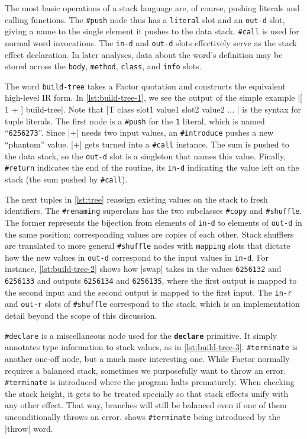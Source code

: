 The most basic operations of a stack language are, of course, pushing literals
and calling functions.  The \Verb|#push| node thus has a \Verb|literal| slot
and an \Verb|out-d| slot, giving a name to the single element it pushes to the
data stack.  \Verb|#call| is used for normal word invocations.  The \Verb|in-d|
and \Verb|out-d| slots effectively serve as the stack effect declaration.  In
later analyses, data about the word's definition may be stored across the
\Verb|body|, \Verb|method|, \Verb|class|, and \Verb|info| slots.

The word \Verb|build-tree| takes a Factor quotation and constructs the
equivalent high-level \gls{IR} form.  In \vref{lst:build-tree-1}, we see the
output of the simple example
%
\factor|[ 1 + ] build-tree|.
%
Note that
%
\factor|T{ class { slot1 value1 } { slot2 value2 } ... }|
%
is the syntax for tuple literals.  The first node is a \Verb|#push| for the
\Verb|1| literal, which is named ``\Verb|6256273|''.  Since \factor|+| needs
two input values, an \Verb|#introduce| pushes a new ``phantom'' value.
\factor|+| gets turned into a \Verb|#call| instance.  The sum is pushed to the
data stack, so the \Verb|out-d| slot is a singleton that names this value.
Finally, \Verb|#return| indicates the end of the routine, its \Verb|in-d|
indicating the value left on the stack (the sum pushed by \Verb|#call|).


The next tuples in \vref{lst:tree} reassign existing values on the stack to
fresh identifiers.  The \Verb|#renaming| superclass has the two subclasses
\Verb|#copy| and \Verb|#shuffle|.  The former represents the bijection from
elements of \Verb|in-d| to elements of \Verb|out-d| in the same position;
corresponding values are copies of each other.  Stack shufflers are translated
to more general \Verb|#shuffle| nodes with \Verb|mapping| slots that dictate
how the new values in \Verb|out-d| correspond to the input values in
\Verb|in-d|.  For instance, \vref{lst:build-tree-2} shows how \factor|swap|
takes in the values \Verb|6256132| and \Verb|6256133| and outputs
\Verb|6256134| and \Verb|6256135|, where the first output is mapped to the
second input and the second output is mapped to the first input.  The
\Verb|in-r| and \Verb|out-r| slots of \Verb|#shuffle| correspond to the
 stack, which is an implementation detail beyond the scope of this
discussion.


\Verb|#declare| is a miscellaneous node used for the \texttt{\textbf{declare}}
primitive.  It simply annotates type information to stack values, as in
\vref{lst:build-tree-3}.  \Verb|#terminate| is another one-off node, but a much
more interesting one.  While Factor normally requires a balanced stack,
sometimes we purposefully want to throw an error.  \Verb|#terminate| is
introduced where the program halts prematurely.  When checking the stack
height, it gets to be treated specially so that  stack effects
unify with any other effect.  That way, branches will still be balanced even if
one of them unconditionally throws an error.   shows
\Verb|#terminate| being introduced by the \factor|throw| word.

